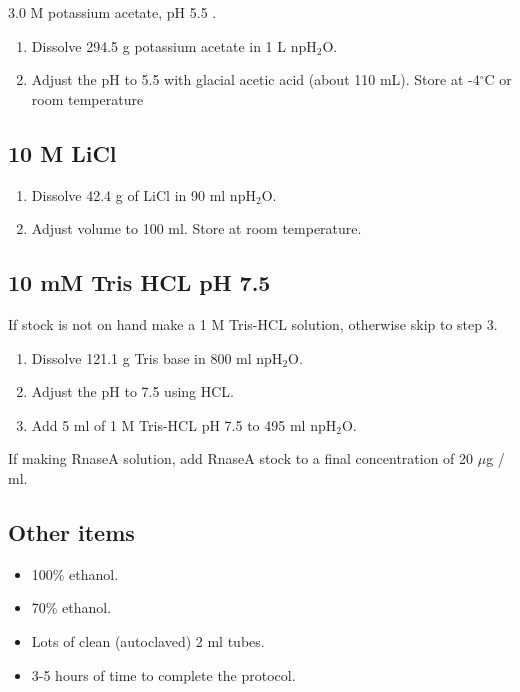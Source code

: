 \documentclass[12pt]{article}
\theoremstyle{definition}
\begin{document}
3.0 M potassium acetate, pH 5.5 .

\begin{enumerate}
	\item Dissolve 294.5 g potassium acetate in 1 L npH$_2$O.
	\item Adjust the pH to 5.5 with glacial acetic acid (about 110 mL). Store at -4$^{\circ}$C or room temperature
\end{enumerate}

\subsection*{10 M LiCl}
\label{sec:licl}

\begin{enumerate}
	\item Dissolve 42.4 g of LiCl in 90 ml npH$_2$O.
	\item Adjust volume to 100 ml. Store at room temperature.
\end{enumerate}

\subsection*{10 mM Tris HCL pH 7.5}
\label{sec:tris}

If stock is not on hand make a 1 M Tris-HCL solution, otherwise skip to step 3.

\begin{enumerate}
	\item Dissolve 121.1 g Tris base in 800 ml npH$_2$O.
	\item Adjust the pH to 7.5 using HCL.
	\item Add 5 ml of 1 M Tris-HCL pH 7.5 to 495 ml npH$_2$O.
\end{enumerate}

If making RnaseA solution, add RnaseA stock to a final concentration of 20 $\mu$g / ml. 


\subsection*{Other items}

\begin{itemize}
	\item 100\% ethanol.
	\item 70\% ethanol.
	\item Lots of clean (autoclaved) 2 ml tubes.
	\item 3-5 hours of time to complete the protocol.
\end{itemize}
\end{document}
